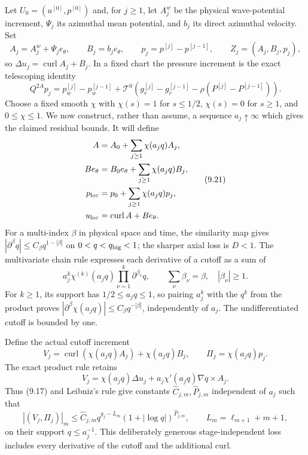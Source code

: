 \documentclass[10pt,a4paper]{article}
\begin{document}
Let $U_0=(u^{[0]},p^{[0]})$ and, for $j\ge1$, let $A_j^w$ be the physical
wave-potential increment, $\Psi_j$ its azimuthal mean potential, and $b_j$ its
direct azimuthal velocity.  Set
\[
 A_j=A_j^w+\Psi_je_\theta,\qquad B_j=b_je_\theta,\qquad
 p_j=p^{[j]}-p^{[j-1]},\qquad Z_j=(A_j,B_j,p_j),
\]
so $\Delta u_j=\operatorname{curl}A_j+B_j$.  In a fixed chart the pressure
increment is the exact telescoping identity
\begin{equation}
 Q^{2A}p_j=p_w^{[j]}-p_w^{[j-1]}+
 \mathcal T^0\!\left(g_r^{[j]}-g_r^{[j-1]}-\rho(P^{[j]}-P^{[j-1]})\right). \tag{9.16}
\end{equation}
Choose a fixed smooth $\chi$ with $\chi(s)=1$ for $s\le1/2$,
$\chi(s)=0$ for $s\ge1$, and $0\le\chi\le1$. We now construct, rather
than assume, a sequence $a_j\uparrow\infty$ which gives the claimed
residual bounds. It will define
\begin{equation}
 \begin{aligned}
 A&=A_0+\sum_{j\ge1}\chi(a_jq)A_j,\\
 Be_\theta&=B_0e_\theta+\sum_{j\ge1}\chi(a_jq)B_j,\\
 p_{\rm loc}&=p_0+\sum_{j\ge1}\chi(a_jq)p_j,\\
 u_{\rm loc}&=\operatorname{curl}A+Be_\theta .
 \end{aligned}                \tag{9.21}
\end{equation}
For a multi-index $\beta$ in physical space and time, the similarity map
gives $|\partial^\beta q|\le C_\beta q^{1-|\beta|}$ on $0<q<q_{\rm big}<1$;
the sharper axial loss is $D<1$. The multivariate chain rule expresses
each derivative of a cutoff as a sum of
\[
a_j^k\chi^{(k)}(a_jq)
\prod_{\nu=1}^k\partial^{\beta_\nu}q,\qquad
\sum_\nu\beta_\nu=\beta,\quad |\beta_\nu|\ge1 .
\]
For $k\ge1$, its support has $1/2\le a_jq\le1$, so pairing
$a_j^k$ with the $q^k$ from the product proves
$|\partial^\beta\chi(a_jq)|\le C_\beta q^{-|\beta|}$, independently
of $a_j$. The undifferentiated cutoff is bounded by one.

Define the actual cutoff increment
\[
V_j=\operatorname{curl}(\chi(a_jq)A_j)+\chi(a_jq)B_j,\qquad
\Pi_j=\chi(a_jq)p_j .
\]
The exact product rule retains
\[
V_j=\chi(a_jq)\Delta u_j
+a_j\chi'(a_jq)\nabla q\times A_j .
\]
Thus (9.17) and Leibniz's rule give constants
$\widehat C_{j,m},\widehat P_{j,m}$ independent of $a_j$ such that
\[
|(V_j,\Pi_j)|_m\le
\widehat C_{j,m}q^{g_j-L_m}(1+|\log q|)^{\widehat P_{j,m}},
\qquad L_m=\ell_{m+1}+m+1 ,
\]
on their support $q\le a_j^{-1}$. This deliberately generous
stage-independent loss includes every derivative of the cutoff and
the additional curl.
\end{document}
